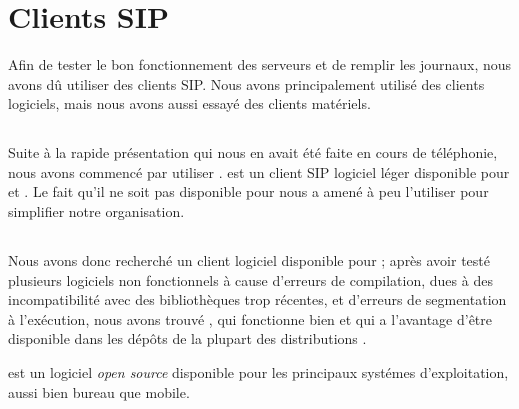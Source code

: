 \section{Clients SIP}

Afin de tester le bon fonctionnement des serveurs et de remplir les journaux, nous avons dû utiliser des clients SIP. Nous avons principalement utilisé des clients logiciels, mais nous avons aussi essayé des clients matériels.

\subsection{\xlite}

Suite à la rapide présentation qui nous en avait été faite en cours de téléphonie, nous avons commencé par utiliser {\xlite}. {\xlite} est un client SIP logiciel léger disponible pour {\win} et {\mac}. Le fait qu’il ne soit pas disponible pour {\lnx} nous a amené à peu l’utiliser pour simplifier notre organisation.


\subsection{\lnp}

Nous avons donc recherché un client logiciel disponible pour {\lnx} ; après avoir testé plusieurs logiciels non fonctionnels à cause d’erreurs de compilation, dues à des incompatibilité avec des bibliothèques trop récentes, et d’erreurs de segmentation à l’exécution, nous avons trouvé {\lnp}, qui fonctionne bien et qui a l’avantage d’être disponible dans les dépôts de la plupart des distributions {\lnx}.


{\lnp} est un logiciel \textit{open source} disponible pour les principaux systémes d’exploitation, aussi bien bureau que mobile.


\subsection{\cph}


\subsection{\cata}


